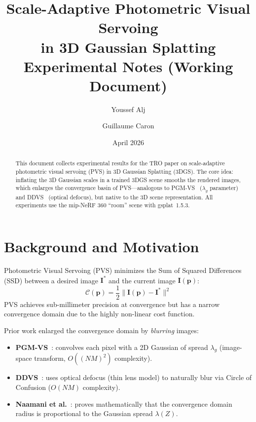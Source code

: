 \documentclass[11pt]{article}
\title{Scale-Adaptive Photometric Visual Servoing\\in 3D Gaussian Splatting\\[0.5em]\large Experimental Notes (Working Document)}
\author{Youssef Alj \and Guillaume Caron}
\date{April 2026}
\begin{document}
\maketitle

\begin{abstract}
This document collects experimental results for the TRO paper on scale-adaptive photometric visual servoing (PVS) in 3D Gaussian Splatting (3DGS).
The core idea: inflating the 3D Gaussian scales in a trained 3DGS scene smooths the rendered images, which enlarges the convergence basin of PVS---analogous to PGM-VS~\cite{crombez2019tro} ($\lambda_g$ parameter) and DDVS~\cite{caron2021ral} (optical defocus), but native to the 3D scene representation.
All experiments use the mip-NeRF 360 ``room'' scene with gsplat~1.5.3.
\end{abstract}

\tableofcontents
\newpage

\section{Background and Motivation}

Photometric Visual Servoing (PVS) minimizes the Sum of Squared Differences (SSD) between a desired image $\mathbf{I}^*$ and the current image $\mathbf{I}(\mathbf{p})$:
\begin{equation}
    \mathcal{C}(\mathbf{p}) = \frac{1}{2} \| \mathbf{I}(\mathbf{p}) - \mathbf{I}^* \|^2
\end{equation}
PVS achieves sub-millimeter precision at convergence but has a narrow convergence domain due to the highly non-linear cost function.

Prior work enlarged the convergence domain by \emph{blurring} images:
\begin{itemize}
    \item \textbf{PGM-VS}~\cite{crombez2019tro}: convolves each pixel with a 2D Gaussian of spread $\lambda_g$ (image-space transform, $O((NM)^2)$ complexity).
    \item \textbf{DDVS}~\cite{caron2021ral}: uses optical defocus (thin lens model) to naturally blur via Circle of Confusion ($O(NM)$ complexity).
    \item \textbf{Naamani et al.}~\cite{naamani2024iros}: proves mathematically that the convergence domain radius is proportional to the Gaussian spread $\lambda(Z)$.
\end{itemize}
\end{document}
